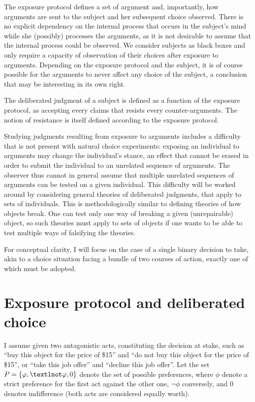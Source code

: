 \documentclass[version=last, pagesize, twoside=off, bibliography=totoc, DIV=calc, fontsize=12pt, a4paper, french, english]{scrartcl}
\begin{document}
The exposure protocol defines a set of argument and, importantly, how arguments are sent to the subject and her subsequent choice observed. There is no explicit dependency on the internal process that occurs in the subject’s mind while she (possibly) processes the arguments, as it is not desirable to assume that the internal process could be observed. We consider subjects as black boxes and only require a capacity of observation of their choices after exposure to arguments. Depending on the exposure protocol and the subject, it is of course possible for the arguments to never affect any choice of the subject, a conclusion that may be interesting in its own right.

The deliberated judgment of a subject is defined as a function of the exposure protocol, as accepting every claims that resists every counter-arguments. The notion of resistance is itself defined according to the exposure protocol.

Studying judgments resulting from exposure to arguments includes a difficulty that is not present with natural choice experiments: exposing an individual to arguments may change the individual’s stance, an effect that cannot be erased in order to submit the individual to an unrelated sequence of arguments. The observer thus cannot in general assume that multiple unrelated sequences of arguments can be tested on a given individual. This difficulty will be worked around by considering general theories of deliberated judgments, that apply to sets of individuals. This is methodologically similar to defining theories of how objects break. One can test only one way of breaking a given (unrepairable) object, so such theories must apply to sets of objects if one wants to be able to test multiple ways of falsifying the theories.

For conceptual clarity, I will focus on the case of a single binary decision to take, akin to a choice situation facing a bundle of two courses of action, exactly one of which must be adopted.

\section{Exposure protocol and deliberated choice}
I assume given two antagonistic acts, constituting the decision at stake, such as “buy this object for the price of \$15” and “do not buy this object for the price of \$15”, or “take this job offer” and “decline this job offer”.
Let the set $P = \set{\phi, ¬\phi, 0}$ denote the set of possible preferences, where $\phi$ denote a strict preference for the first act against the other one, $¬\phi$ conversely, and $0$ denotes indifference (both acts are considered equally worth).
\end{document}
